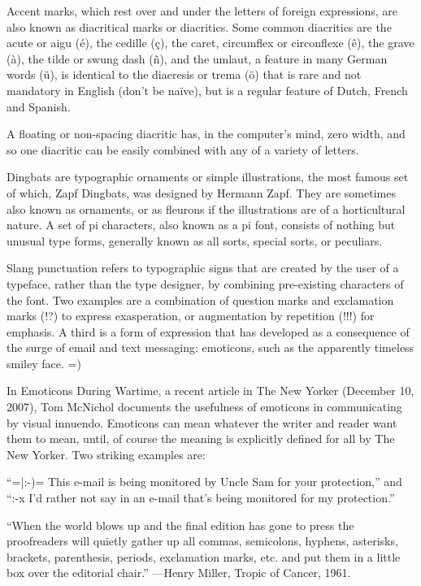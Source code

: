 \documentclass[12pt,a4paper,twocolumn]{book} %
\begin{document}
Accent marks, which rest over and under the letters of foreign expressions, are also known as diacritical marks or diacritics. Some common diacritics are the acute or aigu (é), the cedille (ç), the caret, circumflex or circonflexe (ê), the grave (à), the tilde or swung dash (ñ), and the umlaut, a feature in many German words (ü), is identical to the diaeresis or trema (ö) that is rare and not mandatory in English (don’t be naïve), but is a regular feature of Dutch, French and Spanish.

A floating or non-spacing diacritic has, in the computer’s mind, zero width, and so one diacritic can be easily combined with any of a variety of letters.

Dingbats are typographic ornaments or simple illustrations, the most famous set of which, Zapf Dingbats, was designed by Hermann Zapf. They are sometimes also known as ornaments, or as fleurons if the illustrations are of a horticultural nature. A set of pi characters, also known as a pi font, consists of nothing but unusual type forms, generally known as all sorts, special sorts, or peculiars.

Slang punctuation refers to typographic signs that are created by the user of a typeface, rather than the type designer, by combining pre-existing characters of the font. Two examples are a combination of question marks and exclamation marks (!?) to express exasperation, or augmentation by repetition (!!!) for emphasis. A third is a form of expression that has developed as a consequence of the surge of email and text messaging: emoticons, such as the apparently timeless smiley face. =)

In Emoticons During Wartime, a recent article in The New Yorker (December 10, 2007), Tom McNichol documents the usefulness of emoticons in communicating by visual innuendo. Emoticons can mean whatever the writer and reader want them to mean, until, of course the meaning is explicitly defined for all by The New Yorker. Two striking examples are:

“=|:-)= This e-mail is being monitored by Uncle Sam for your protection,” and “:-x I’d rather not say in an e-mail that’s being monitored for my protection.”

“When the world blows up and the final edition has gone to press the proofreaders will quietly gather up all commas, semicolons, hyphens, asterisks, brackets, parenthesis, periods, exclamation marks, etc. and put them in a little box over the editorial chair.”
—Henry Miller, Tropic of Cancer, 1961.
\end{document}
